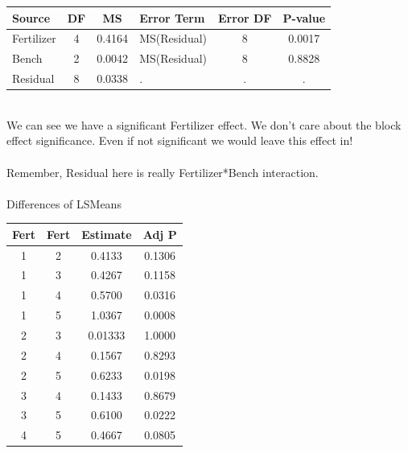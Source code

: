 \begin{center}
\begin{tabular}{l|c|c|l|c|c}
    Source & DF  & MS & Error Term & Error DF & P-value\\\hline
    
Fertilizer     &      4      &  0.4164 &                   MS(Residual)  &     8&0.0017\\                       
Bench          &        2     &   0.0042     &                 MS(Residual)   &    8&0.8828\\
Residual      &      8   &   0.0338      &                   .            &              .&.
\end{tabular}
\end{center}
~\\
We can see we have a significant Fertilizer effect.  We don't care about the block effect significance.  Even if not significant we would leave this effect in!\\~\\
Remember, Residual here is really Fertilizer*Bench interaction.\\~\\

Differences of LSMeans\\
\begin{center}  
    \begin{tabular}{c|c|c|c}
  Fert  &   Fert  & Estimate &   Adj P\\\hline  
  1     &         2&     0.4133 &  0.1306\\
  1     &         3&     0.4267 &  0.1158\\  
  1     &         4&     0.5700&  0.0316\\  
  1     &         5&     1.0367 &  0.0008\\  
  2     &         3&   0.01333 &  1.0000\\  
  2     &         4&   0.1567 &  0.8293\\  
  2     &         5&     0.6233 &  0.0198\\  
  3     &         4&    0.1433  &  0.8679\\  
  3     &         5&     0.6100&  0.0222\\  
  4     &         5&    0.4667&  0.0805
\end{tabular}
\end{center}


